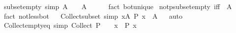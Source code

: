 \begin{isabellebody}
%
\isadelimproof
\isanewline
%
\endisadelimproof
\isanewline
{}\isamarkupfalse%
\ subset{\isacharunderscore}{\kern0pt}empty\ {\isacharbrackleft}{\kern0pt}simp{\isacharbrackright}{\kern0pt}{\isacharcolon}{\kern0pt}\ {\isachardoublequoteopen}A\ {\isasymsubseteq}\ {\isacharbraceleft}{\kern0pt}{\isacharbraceright}{\kern0pt}\ {\isasymlongleftrightarrow}\ A\ {\isacharequal}{\kern0pt}\ {\isacharbraceleft}{\kern0pt}{\isacharbraceright}{\kern0pt}{\isachardoublequoteclose}\isanewline
%
\isadelimproof
\ \ %
\endisadelimproof
%
\isatagproof
{}\isamarkupfalse%
\ {\isacharparenleft}{\kern0pt}fact\ bot{\isacharunderscore}{\kern0pt}unique{\isacharparenright}{\kern0pt}%
\endisatagproof
{\isafoldproof}%
%
\isadelimproof
\isanewline
%
\endisadelimproof
\isanewline
{}\isamarkupfalse%
\ not{\isacharunderscore}{\kern0pt}psubset{\isacharunderscore}{\kern0pt}empty\ {\isacharbrackleft}{\kern0pt}iff{\isacharbrackright}{\kern0pt}{\isacharcolon}{\kern0pt}\ {\isachardoublequoteopen}{\isasymnot}\ {\isacharparenleft}{\kern0pt}A\ {\isacharless}{\kern0pt}\ {\isacharbraceleft}{\kern0pt}{\isacharbraceright}{\kern0pt}{\isacharparenright}{\kern0pt}{\isachardoublequoteclose}\isanewline
%
\isadelimproof
\ \ %
\endisadelimproof
%
\isatagproof
{}\isamarkupfalse%
\ {\isacharparenleft}{\kern0pt}fact\ not{\isacharunderscore}{\kern0pt}less{\isacharunderscore}{\kern0pt}bot{\isacharparenright}{\kern0pt}%
\endisatagproof
{\isafoldproof}%
%
\isadelimproof
%
\endisadelimproof
\ \isanewline
\isanewline
{}\isamarkupfalse%
\ Collect{\isacharunderscore}{\kern0pt}subset\ {\isacharbrackleft}{\kern0pt}simp{\isacharbrackright}{\kern0pt}{\isacharcolon}{\kern0pt}\ {\isachardoublequoteopen}{\isacharbraceleft}{\kern0pt}x{\isasymin}A{\isachardot}{\kern0pt}\ P\ x{\isacharbraceright}{\kern0pt}\ {\isasymsubseteq}\ A{\isachardoublequoteclose}%
\isadelimproof
\ %
\endisadelimproof
%
\isatagproof
{}\isamarkupfalse%
\ auto%
\endisatagproof
{\isafoldproof}%
%
\isadelimproof
%
\endisadelimproof
\isanewline
\isanewline
{}\isamarkupfalse%
\ Collect{\isacharunderscore}{\kern0pt}empty{\isacharunderscore}{\kern0pt}eq\ {\isacharbrackleft}{\kern0pt}simp{\isacharbrackright}{\kern0pt}{\isacharcolon}{\kern0pt}\ {\isachardoublequoteopen}Collect\ P\ {\isacharequal}{\kern0pt}\ {\isacharbraceleft}{\kern0pt}{\isacharbraceright}{\kern0pt}\ {\isasymlongleftrightarrow}\ {\isacharparenleft}{\kern0pt}{\isasymforall}x{\isachardot}{\kern0pt}\ {\isasymnot}\ P\ x{\isacharparenright}{\kern0pt}{\isachardoublequoteclose}\isanewline
%
\isadelimproof
\ \ %

\end{isabellebody}
